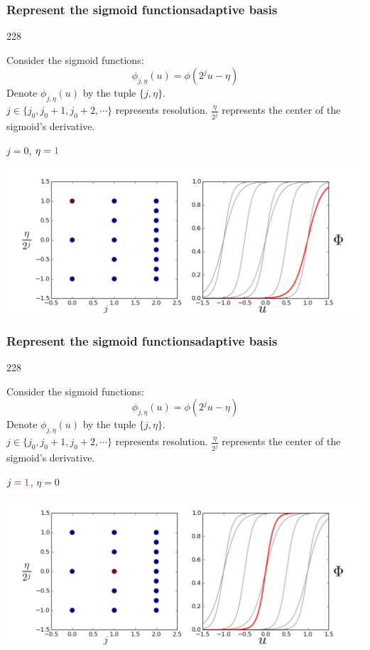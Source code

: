 \documentclass{beamer}
\newcommand{\barrow}{\item[\color{darkred}\ding{228}]}
\begin{document}
\setcounter{framenumber}{15} 
\begin{frame}
    \frametitle{Represent the sigmoid functions\hfill \scriptsize{adaptive basis}}\small
    \begin{dinglist}{228}
        \barrow
        Consider the sigmoid functions:
        $$
            \phi_{j, \eta}(u) = \phi(2^j u - \eta)
        $$
        Denote $\phi_{j, \eta}(u)$ by the tuple $\{j, \eta\}$.\\
        \vspace{.2cm}
        $j\in \{j_0, j_0+1, j_0+2, \cdots \}$ represents resolution. $\frac{\eta}{2^j}$ represents
        the center of the sigmoid's derivative.
        \barrow $j=0$, $\eta=\textcolor{red}{1}$\\
        \begin{center}
            \includegraphics[width=10.cm]{basis_2.png}
        \end{center}
    \end{dinglist}
\end{frame}

\setcounter{framenumber}{15} 
\begin{frame}
    \frametitle{Represent the sigmoid functions\hfill \scriptsize{adaptive basis}}\small
    \begin{dinglist}{228}
        \barrow
        Consider the sigmoid functions:
        $$
            \phi_{j, \eta}(u) = \phi(2^j u - \eta)
        $$
        Denote $\phi_{j, \eta}(u)$ by the tuple $\{j, \eta\}$.\\
        \vspace{.2cm}
        $j\in \{j_0, j_0+1, j_0+2, \cdots \}$ represents resolution. $\frac{\eta}{2^j}$ represents
        the center of the sigmoid's derivative.
        \barrow $j=\textcolor{red}{1}$, $\eta=0$\\
        \begin{center}
            \includegraphics[width=10.cm]{basis_3.png}
        \end{center}
    \end{dinglist}
\end{frame}
\end{document}
